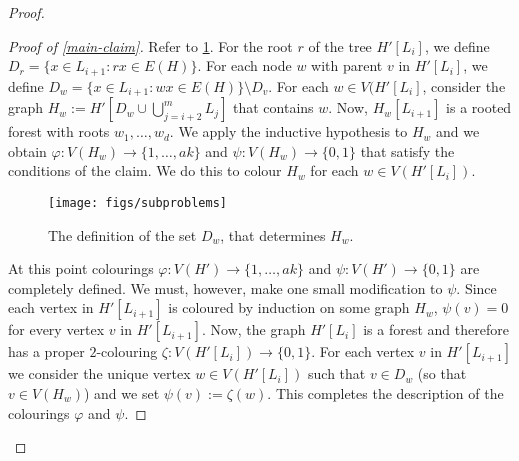 \documentclass[kpfonts]{patmorin}
\begin{document}
\begin{proof}
\begin{proof}[Proof of \cref{main-claim}]
       Refer to \cref{subproblems}.
       For the root $r$ of the tree $H'[L_i]$, we define $D_r=\{x\in L_{i+1}:rx\in E(H)\}$.  For each node $w$ with parent $v$ in $H'[L_i]$, we define $D_w=\{x\in L_{i+1}:wx\in E(H)\}\setminus D_{v}$.
       For each $w\in V(H'[L_i]$, consider the graph $H_w:= H'[D_w\cup \bigcup_{j=i+2}^m L_j]$ that contains $w$.
       Now, $H_w[L_{i+1}]$ is a rooted forest with roots $w_1,\ldots,w_d$.  We apply the inductive hypothesis to $H_w$ and we obtain $\varphi:V(H_w)\to\{1,\ldots,ak\}$ and $\psi:V(H_w)\to\{0,1\}$ that satisfy the conditions of the claim.  We do this to colour $H_w$ for each $w\in V(H'[L_i])$.

      \begin{figure}
          \begin{center}
               \texttt{[image: figs/subproblems]}
          \end{center}
          \caption{The definition of the set $D_w$, that determines $H_w$.}
          \label{subproblems}
      \end{figure}

       At this point colourings $\varphi:V(H')\to\{1,\ldots,ak\}$ and $\psi:V(H')\to\{0,1\}$ are completely defined.  We must, however, make one small modification to $\psi$.  Since each vertex in $H'[L_{i+1}]$ is coloured by induction on some graph $H_w$, $\psi(v)=0$ for every vertex $v$ in $H'[L_{i+1}]$.  Now, the graph $H'[L_i]$ is a forest and therefore has a proper $2$-colouring $\zeta:V(H'[L_i])\to\{0,1\}$.  For each vertex $v$ in $H'[L_{i+1}]$ we consider the unique vertex $w\in V(H'[L_i])$ such that $v\in D_w$ (so that $v\in V(H_w)$) and we set $\psi(v):=\zeta(w)$.  This completes the description of the colourings $\varphi$ and $\psi$.


\end{proof}
\end{proof}
\end{document}
